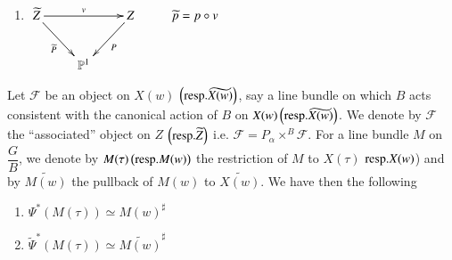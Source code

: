 \begin{Proof}
\begin{enumerate}
\item $\xymatrix{
\widetilde{Z}\ar[dr]_{\widetilde{P}}\ar@{->}[rr]^{v}&&Z\ar[dl]^{P} & \widetilde{p}=p\circ v\\
&\mathbb{P}^{1}&}$
\end{enumerate}

Let $\mathscr{F}$ be an object on $X(w)$
$\left(\mathrm{resp.} \widetilde{X(w)}\right)$, say a line bundle on which $B$
acts consistent with the canonical action of $B$ on
$X(w) \left(\mathrm{resp.} \widetilde{X(w)}\right)$. We denote by $\mathscr{F}$
the ``associated'' object on $Z$ $\left(\mathrm{resp.} \widetilde{Z}\right)$
i.e. $\mathscr{F}=P_{\alpha}\times^{B}\mathscr{F}$. For a line bundle
$M$ on $\dfrac{G}{B}$, we denote by $M(\tau) \left(\mathrm{resp.} M(w)\right)$
the restriction of $M$ to $X(\tau)$ $\mathrm{resp.} X(w)$) and by
$\widetilde{M(w)}$ the pullback of $M(w)$ to $\widetilde{X(w)}$. We
have then the following
\end{Proof}

\begin{lem}\label{lem1}
\begin{enumerate}
\renewcommand{\theenumi}{\roman{enumi}}
\renewcommand{\labelenumi}{(\theenumi)}
\item $\Psi^{\ast}(M(\tau))\simeq M(w)^{\sharp}$
\item $\widetilde{\Psi}^{\ast}(M(\tau))\simeq \widetilde{M(w)}^{\sharp}$
\end{enumerate}
\end{lem}

